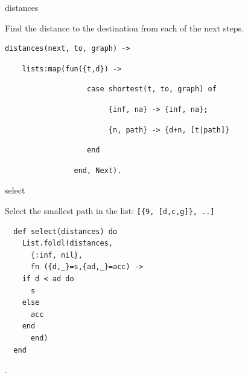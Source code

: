 \begin{frame}[fragile]{distances}

  Find the distance to the destination from each of the next steps.

\vspace{20pt} \pause
  
\begin{verbatim}
distances(next, to, graph) ->
\end{verbatim}
\pause
\begin{verbatim}
    lists:map(fun({t,d}) ->   
\end{verbatim}
\pause
\begin{verbatim}
                   case shortest(t, to, graph) of 
\end{verbatim}
\pause
\begin{verbatim}
                        {inf, na} -> {inf, na};
\end{verbatim}
\pause
\begin{verbatim}
                        {n, path} -> {d+n, [t|path]}
\end{verbatim}
\pause
\begin{verbatim}
                   end
\end{verbatim}
\begin{verbatim}
                end, Next).    
\end{verbatim}
\end{frame}

\begin{frame}[fragile]{select}

Select the smallest path in the list: \texttt{[\{9, [d,c,g]\}, ..]}

\vspace{10pt}\pause

\begin{verbatim}
  def select(distances) do
    List.foldl(distances,
      {:inf, nil},
      fn ({d,_}=s,{ad,_}=acc) ->
	if d < ad do
	  s
	else
	  acc
	end
      end)
  end
\end{verbatim}

\pause{}.
\end{frame}

